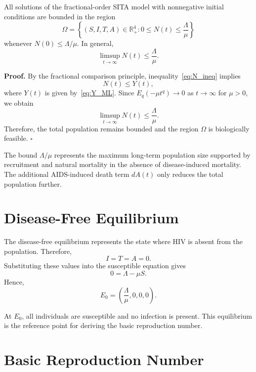 \begin{resultbox}[title={Theorem 4.3 --- Boundedness}]
All solutions of the fractional-order SITA model with nonnegative initial conditions are bounded in the region
\[
\Omega=
\left\{
(S,I,T,A)\in\mathbb{R}_+^4:
0\leq N(t)\leq \frac{\Lambda}{\mu}
\right\}
\]
whenever $N(0)\leq \Lambda/\mu$. In general,
\[
\limsup_{t\to\infty}N(t)\leq\frac{\Lambda}{\mu}.
\]
\end{resultbox}

\noindent\textbf{Proof.}
By the fractional comparison principle, inequality~\eqref{eq:N_ineq} implies
\[
N(t)\leq Y(t),
\]
where $Y(t)$ is given by~\eqref{eq:Y_ML}. Since $E_q(-\mu t^q)\to0$ as $t\to\infty$ for $\mu>0$, we obtain
\[
\limsup_{t\to\infty}N(t)\leq\frac{\Lambda}{\mu}.
\]
Therefore, the total population remains bounded and the region $\Omega$ is biologically feasible. \hfill$\square$

\begin{remarkbox}[title={Biological meaning}]
The bound $\Lambda/\mu$ represents the maximum long-term population size supported by recruitment and natural mortality in the absence of disease-induced mortality. The additional AIDS-induced death term $dA(t)$ only reduces the total population further.
\end{remarkbox}

\section{Disease-Free Equilibrium}

The disease-free equilibrium represents the state where HIV is absent from the population. Therefore,
\[
I=T=A=0.
\]
Substituting these values into the susceptible equation gives
\[
0=\Lambda-\mu S.
\]
Hence,
\begin{equation}
E_0=\left(\frac{\Lambda}{\mu},0,0,0\right).
\label{eq:dfe}
\end{equation}

\begin{remarkbox}[title={Interpretation}]
At $E_0$, all individuals are susceptible and no infection is present. This equilibrium is the reference point for deriving the basic reproduction number.
\end{remarkbox}

\section{Basic Reproduction Number}

